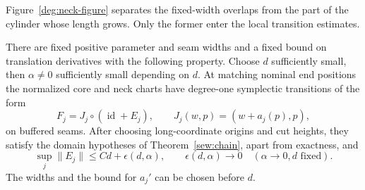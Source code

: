 Figure~\ref{deg:neck-figure} separates the fixed-width overlaps from
the part of the cylinder whose length grows.  Only the former
enter the local transition estimates.

\begin{lemma}\label{deg:seams}
There are fixed positive parameter and seam widths and a fixed
bound on translation derivatives with the following property.
Choose $d$ sufficiently small, then $\alpha\neq0$ sufficiently
small depending on $d$.  At matching nominal end positions the
normalized core and neck charts have degree-one symplectic
transitions of the form
\[
         F_j=J_j\circ(\operatorname{id}+E_j),\qquad
         J_j(w,p)=(w+a_j(p),p),
\]
on buffered seams.  After choosing long-coordinate origins and
cut heights, they satisfy the domain hypotheses of
Theorem~\ref{sew:chain}, apart from exactness, and
\[
                     \sup_j\|E_j\|\leq C d+\epsilon(d,\alpha),
              \qquad \epsilon(d,\alpha)\longrightarrow0
                            \quad(\alpha\to0, d\text{ fixed}).
\]
The widths and the bound for $a_j'$ can be chosen before $d$.
\end{lemma}

